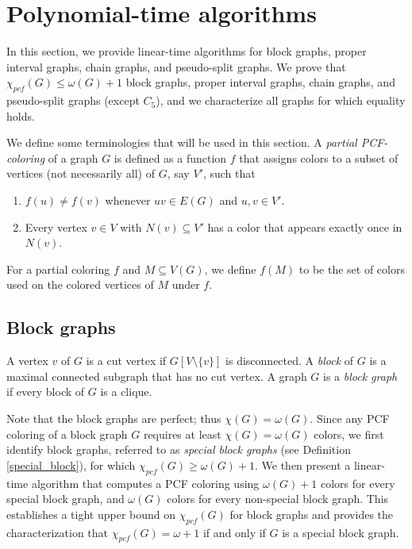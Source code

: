 \documentclass[11pt]{article}
\theoremstyle{plain}
\begin{document}
	\section{Polynomial-time algorithms}
	
	In this section, we provide linear-time algorithms for block graphs, proper interval graphs, chain graphs, and pseudo-split graphs. We prove that $\chi_{pcf}(G)\leq\omega(G)+1$ block graphs, proper interval graphs, chain graphs, and pseudo-split graphs (except $C_5$),  and we characterize all graphs for which equality holds.
	
	\medskip
	
	We define some terminologies that will be used in this section.
	A \emph{partial PCF-coloring} of a graph $G$ is defined as a function $f$ that assigns colors to a subset of vertices (not necessarily all) of $G$, say $V'$, such that
	\begin{enumerate}
		\item $f(u)\neq f(v)$ whenever $uv\in E(G)$ and $u, v\in V'$.
		\item Every vertex $v\in V$ with $N(v)\subseteq V'$ has a color that appears exactly once in $N(v)$.
	\end{enumerate}
	
	For a partial coloring $f$ and $M\subseteq V(G)$, we define $f(M)$ to be the set of colors used on the colored vertices of $M$ under $f$.
	
	\subsection{Block graphs}
	
	A vertex $v$ of $G$ is a cut vertex if $G[V\setminus\{v\}]$ is disconnected. A \emph{block} of $G$ is a maximal connected subgraph that has no cut vertex. A graph $G$ is a \emph{block graph} if every block of $G$ is a clique.
	
	\medskip
	
	Note that the block graphs are perfect; thus $\chi(G) = \omega(G)$. Since any PCF coloring of a block graph $G$ requires at least $\chi(G) = \omega(G)$ colors, we first identify block graphs, referred to as \emph{special block graphs} (see Definition \ref{special_block}), for which $\chi_{pcf}(G) \geq \omega(G)+1$. We then present a linear-time algorithm that computes a PCF coloring using $\omega(G)+1$ colors for every special block graph, and $\omega(G)$ colors for every non-special block graph. This establishes a tight upper bound on $\chi_{pcf}(G)$ for block graphs and provides the characterization that $\chi_{pcf}(G) = \omega+1$ if and only if $G$ is a special block graph.
	
\end{document}
